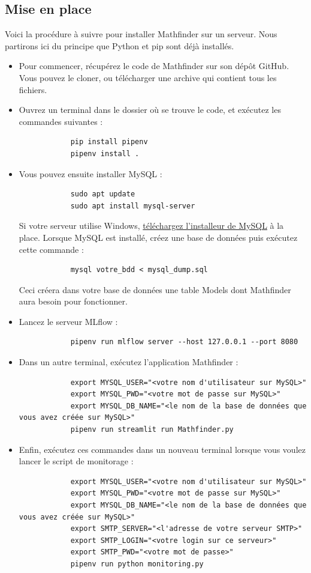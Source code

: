\documentclass[french]{article}
\begin{document}
    \subsection{Mise en place}
    Voici la procédure à suivre pour installer Mathfinder sur un serveur. Nous partirons ici du principe que Python et pip sont déjà installés.
    \begin{itemize}
        \item Pour commencer, récupérez le code de Mathfinder sur son dépôt GitHub. Vous pouvez le cloner, ou télécharger une archive qui contient tous les fichiers.
        \item Ouvrez un terminal dans le dossier où se trouve le code, et exécutez les commandes suivantes :
        \begin{verbatim}
            pip install pipenv
            pipenv install .
        \end{verbatim}
        \item Vous pouvez ensuite installer MySQL :
        \begin{verbatim}
            sudo apt update
            sudo apt install mysql-server
        \end{verbatim}
        Si votre serveur utilise Windows, \href{https://dev.mysql.com/doc/refman/8.3/en/windows-installation.html}{téléchargez l'installeur de MySQL} à la place. Lorsque MySQL est installé, créez une base de données puis exécutez cette commande :
        \begin{verbatim}
            mysql votre_bdd < mysql_dump.sql
        \end{verbatim}
        Ceci créera dans votre base de données une table Models dont Mathfinder aura besoin pour fonctionner.
        \item Lancez le serveur MLflow :
        \begin{verbatim}
            pipenv run mlflow server --host 127.0.0.1 --port 8080
        \end{verbatim}
        \item Dans un autre terminal, exécutez l'application Mathfinder :
        \begin{verbatim}
            export MYSQL_USER="<votre nom d'utilisateur sur MySQL>"
            export MYSQL_PWD="<votre mot de passe sur MySQL>"
            export MYSQL_DB_NAME="<le nom de la base de données que vous avez créée sur MySQL>"
            pipenv run streamlit run Mathfinder.py
        \end{verbatim}
        \item Enfin, exécutez ces commandes dans un nouveau terminal lorsque vous voulez lancer le script de monitorage :
        \begin{verbatim}
            export MYSQL_USER="<votre nom d'utilisateur sur MySQL>"
            export MYSQL_PWD="<votre mot de passe sur MySQL>"
            export MYSQL_DB_NAME="<le nom de la base de données que vous avez créée sur MySQL>"
            export SMTP_SERVER="<l'adresse de votre serveur SMTP>"
            export SMTP_LOGIN="<votre login sur ce serveur>"
            export SMTP_PWD="<votre mot de passe>"
            pipenv run python monitoring.py
        \end{verbatim}
    \end{itemize}
\end{document}
